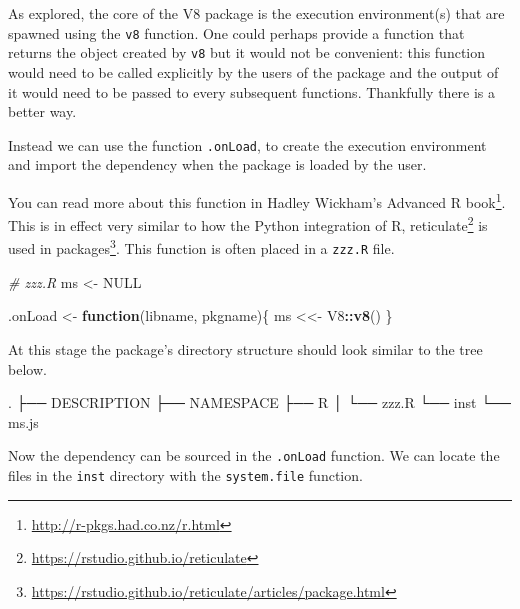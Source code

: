 \documentclass[
]{krantz}
\makeatletter
\newenvironment{Shaded}{\begin{snugshade}}{\end{snugshade}}
\newcommand{\CommentTok}[1]{\textcolor[rgb]{0.37,0.37,0.37}{\textit{#1}}}
\newcommand{\ControlFlowTok}[1]{\textcolor[rgb]{0.27,0.27,0.27}{\textbf{#1}}}
\newcommand{\ExtensionTok}[1]{#1}
\newcommand{\KeywordTok}[1]{\textcolor[rgb]{0.27,0.27,0.27}{\textbf{#1}}}
\newcommand{\NormalTok}[1]{#1}
\newcommand{\OperatorTok}[1]{\textcolor[rgb]{0.43,0.43,0.43}{\textbf{#1}}}
\newcommand{\OtherTok}[1]{\textcolor[rgb]{0.37,0.37,0.37}{#1}}
\newcommand{\StringTok}[1]{\textcolor[rgb]{0.5,0.5,0.5}{#1}}
\renewcommand{\href}[2]{#2\footnote{\url{#1}}}
\newenvironment{kframe}{%
\medskip{}
\setlength{\fboxsep}{.8em}
 \def\at@end@of@kframe{}%
 \ifinner\ifhmode%
  \def\at@end@of@kframe{\end{minipage}}%
  \begin{minipage}{\columnwidth}%
 \fi\fi%
 \def\FrameCommand##1{\hskip\@totalleftmargin \hskip-\fboxsep
 \colorbox{shadecolor}{##1}\hskip-\fboxsep
     \hskip-\linewidth \hskip-\@totalleftmargin \hskip\columnwidth}%
 \MakeFramed {\advance\hsize-\width
   \@totalleftmargin\z@ \linewidth\hsize
   \@setminipage}}%
 {\par\unskip\endMakeFramed%
 \at@end@of@kframe}
\renewenvironment{Shaded}{\begin{kframe}}{\end{kframe}}
\makeatother
\begin{document}
As explored, the core of the V8 package is the execution environment(s) that are spawned using the \texttt{v8} function. One could perhaps provide a function that returns the object created by \texttt{v8} but it would not be convenient: this function would need to be called explicitly by the users of the package and the output of it would need to be passed to every subsequent functions. Thankfully there is a better way.

Instead we can use the function \texttt{.onLoad}, to create the execution environment and import the dependency when the package is loaded by the user.

You can read more about this function in Hadley Wickham's \href{http://r-pkgs.had.co.nz/r.html}{Advanced R book}. This is in effect very similar to how the Python integration of R, \href{https://rstudio.github.io/reticulate}{reticulate} \citep{R-reticulate} is \href{https://rstudio.github.io/reticulate/articles/package.html}{used in packages}. This function is often placed in a \texttt{zzz.R} file.

\begin{Shaded}
\begin{Highlighting}[]
\CommentTok{\# zzz.R}
\NormalTok{ms \textless{}{-}}\StringTok{ }\OtherTok{NULL}

\NormalTok{.onLoad \textless{}{-}}\StringTok{ }\ControlFlowTok{function}\NormalTok{(libname, pkgname)\{}
\NormalTok{  ms \textless{}\textless{}{-}}\StringTok{ }\NormalTok{V8}\OperatorTok{::}\KeywordTok{v8}\NormalTok{()}
\NormalTok{\}}
\end{Highlighting}
\end{Shaded}

At this stage the package's directory structure should look similar to the tree below.

\begin{Shaded}
\begin{Highlighting}[]
\ExtensionTok{.}
\NormalTok{├── }\ExtensionTok{DESCRIPTION}
\NormalTok{├── }\ExtensionTok{NAMESPACE}
\NormalTok{├── }\ExtensionTok{R}
\NormalTok{│   └── }\ExtensionTok{zzz.R}
\NormalTok{└── }\ExtensionTok{inst}
\NormalTok{    └── }\ExtensionTok{ms.js}
\end{Highlighting}
\end{Shaded}

Now the dependency can be sourced in the \texttt{.onLoad} function. We can locate the files in the \texttt{inst} directory with the \texttt{system.file} function.
\end{document}
